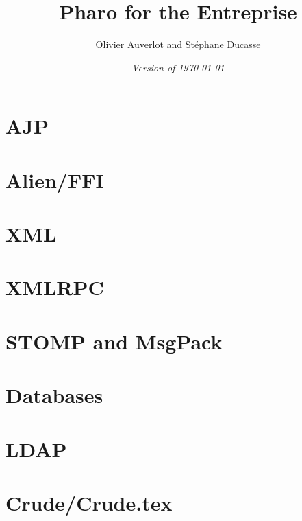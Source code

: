 \documentclass[a4paper,10pt,twoside]{book}
\begin{document}
\frontmatter
\setcounter{page}{1}
\pagestyle{headings}
\author{Olivier Auverlot and St\'ephane Ducasse}
\title{\Huge\textbf{Pharo for the Entreprise}}
\isodate
\date{\emph{Version of \today}}
\maketitle
\tableofcontents
\sloppy %
\mainmatter
\chapter{AJP}

\chapter{Alien/FFI}

\chapter{XML}

\chapter{XMLRPC}

\chapter{STOMP and MsgPack}

\chapter{Databases}

\chapter{LDAP}

\chapter{Crude/Crude.tex}






\printindex
\end{document}
